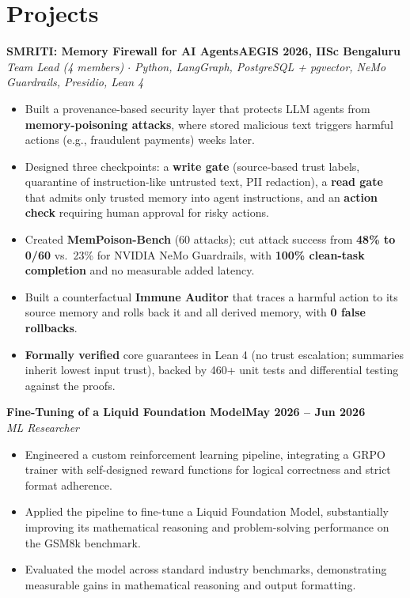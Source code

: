 \documentclass[10pt,a4paper]{article}
\newcommand{\entry}[4]{%
  \textbf{#1}\hfill\textbf{#2}\\
  {\small\textit{#3}}\hfill{\small\textit{#4}}\par}
\begin{document}
\section*{Projects}
\entry{SMRITI: Memory Firewall for AI Agents}{AEGIS 2026, IISc Bengaluru}{Team Lead (4 members) $\cdot$ Python, LangGraph, PostgreSQL + pgvector, NeMo Guardrails, Presidio, Lean 4}{}
\begin{itemize}
  \item Built a provenance-based security layer that protects LLM agents from \textbf{memory-poisoning attacks}, where stored malicious text triggers harmful actions (e.g., fraudulent payments) weeks later.
  \item Designed three checkpoints: a \textbf{write gate} (source-based trust labels, quarantine of instruction-like untrusted text, PII redaction), a \textbf{read gate} that admits only trusted memory into agent instructions, and an \textbf{action check} requiring human approval for risky actions.
  \item Created \textbf{MemPoison-Bench} (60 attacks); cut attack success from \textbf{48\% to 0/60} vs.\ 23\% for NVIDIA NeMo Guardrails, with \textbf{100\% clean-task completion} and no measurable added latency.
  \item Built a counterfactual \textbf{Immune Auditor} that traces a harmful action to its source memory and rolls back it and all derived memory, with \textbf{0 false rollbacks}.
  \item \textbf{Formally verified} core guarantees in Lean 4 (no trust escalation; summaries inherit lowest input trust), backed by 460+ unit tests and differential testing against the proofs.
\end{itemize}

\entry{Fine-Tuning of a Liquid Foundation Model}{May 2026 -- Jun 2026}{ML Researcher}{}
\begin{itemize}
  \item Engineered a custom reinforcement learning pipeline, integrating a GRPO trainer with self-designed reward functions for logical correctness and strict format adherence.
  \item Applied the pipeline to fine-tune a Liquid Foundation Model, substantially improving its mathematical reasoning and problem-solving performance on the GSM8k benchmark.
  \item Evaluated the model across standard industry benchmarks, demonstrating measurable gains in mathematical reasoning and output formatting.
\end{itemize}
\end{document}
